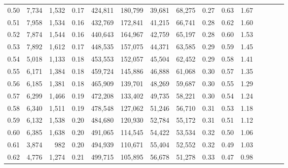 \begin{tabular}{rrrcrrrrrrrrrrr}
0.50 &   7,734 &  1,532 &                                       0.17 &  424,811 &  180,799 &   39,681 &   68,275 &  0.27 &  0.63 &                         1.67 \\
0.51 &   7,958 &  1,534 &                                       0.16 &  432,769 &  172,841 &   41,215 &   66,741 &  0.28 &  0.62 &                         1.60 \\
0.52 &   7,874 &  1,544 &                                       0.16 &  440,643 &  164,967 &   42,759 &   65,197 &  0.28 &  0.60 &                         1.53 \\
0.53 &   7,892 &  1,612 &                                       0.17 &  448,535 &  157,075 &   44,371 &   63,585 &  0.29 &  0.59 &                         1.45 \\
0.54 &   5,018 &  1,133 &                                       0.18 &  453,553 &  152,057 &   45,504 &   62,452 &  0.29 &  0.58 &                         1.41 \\
0.55 &   6,171 &  1,384 &                                       0.18 &  459,724 &  145,886 &   46,888 &   61,068 &  0.30 &  0.57 &                         1.35 \\
0.56 &   6,185 &  1,381 &                                       0.18 &  465,909 &  139,701 &   48,269 &   59,687 &  0.30 &  0.55 &                         1.29 \\
0.57 &   6,299 &  1,466 &                                       0.19 &  472,208 &  133,402 &   49,735 &   58,221 &  0.30 &  0.54 &                         1.24 \\
0.58 &   6,340 &  1,511 &                                       0.19 &  478,548 &  127,062 &   51,246 &   56,710 &  0.31 &  0.53 &                         1.18 \\
0.59 &   6,132 &  1,538 &                                       0.20 &  484,680 &  120,930 &   52,784 &   55,172 &  0.31 &  0.51 &                         1.12 \\
0.60 &   6,385 &  1,638 &                                       0.20 &  491,065 &  114,545 &   54,422 &   53,534 &  0.32 &  0.50 &                         1.06 \\
0.61 &   3,874 &    982 &                                       0.20 &  494,939 &  110,671 &   55,404 &   52,552 &  0.32 &  0.49 &                         1.03 \\
0.62 &   4,776 &  1,274 &                                       0.21 &  499,715 &  105,895 &   56,678 &   51,278 &  0.33 &  0.47 &                         0.98 \\

\end{tabular}
